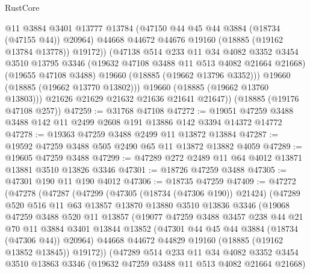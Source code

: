 \begin{lexlean}{RustCore}
\begin{coremodule}
                @11
                @3884
                @3401
                @13777
                @13784
                (@47150 @44 @45 @44 @3884 (@18734 (@47155 @44)) @20964)
                @44668
                @44672
                @44676
                @19160
                (@18885 (@19162 @13784 @13778))
                @19172))
            (@47138
              @514
              @233
              @11
              @34
              @4082
              @3352
              @3454
              @3510
              @13795
              @3346
              (@19632 @47108 @3488 @11 @513 @4082 @21664 @21668)
              (@19655 @47108 @3488)
              @19660
              (@18885 (@19662 @13796 @3352)))
            @19660
            (@18885 (@19662 @13770 @13802)))
          @19660
          (@18885 (@19662 @13760 @13803)))
        @21626
        @21629
        @21632
        @21636
        @21641
        @21647))
    (@18885 (@19176 @47108 @257))
@47259 := @31768 @47108
@47272 := @19051 @47259 @3488 @3488 @142 @11 @2499 @2608 @191 @13886 @142 @3394 @14372 @14772
@47278 := @19363 @47259 @3488 @2499 @11 @13872 @13884
@47287 := @19592 @47259 @3488 @505 @2490 @65 @11 @13872 @13882 @4059
@47289 := @19605 @47259 @3488
@47299 := @47289 @272 @2489 @11 @64 @4012 @13871 @13881 @3510 @13826 @3346
@47301 := @18726 @47259 @3488
@47305 := @47301 @190 @11 @190 @4012
@47306 := @18735 @47259
@47409 := @47272
    (@47278
      (@47287
        (@47299
          (@47305 (@18734 (@47306 @190)) @21424)
          (@47289
            @520
            @516
            @11
            @63
            @13857
            @13870
            @13880
            @3510
            @13836
            @3346
            (@19068
              @47259
              @3488
              @520
              @11
              @13857
              (@19077
                @47259
                @3488
                @3457
                @238
                @44
                @21
                @70
                @11
                @3884
                @3401
                @13844
                @13852
                (@47301 @44 @45 @44 @3884 (@18734 (@47306 @44)) @20964)
                @44668
                @44672
                @44829
                @19160
                (@18885 (@19162 @13852 @13845))
                @19172))
            (@47289
              @514
              @233
              @11
              @34
              @4082
              @3352
              @3454
              @3510
              @13863
              @3346
              (@19632 @47259 @3488 @11 @513 @4082 @21664 @21668)

\end{coremodule}
\end{lexlean}
